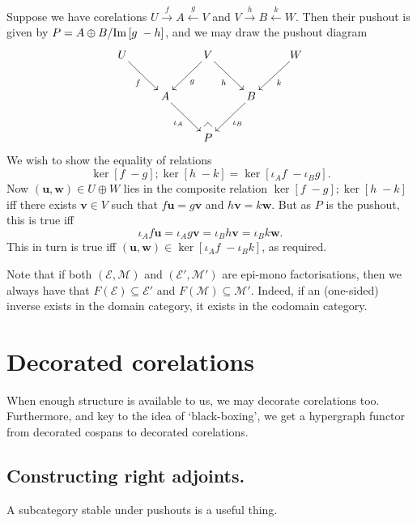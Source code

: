 \begin{example}
  Suppose we have corelations $U \xrightarrow{f} A \xleftarrow{g} V$
  and $V \xrightarrow{h} B \xleftarrow{k} W$. Then their pushout is given by
  $P=A \oplus B/\mathrm{Im}\,[g\;-h]$, and we may draw the pushout diagram
  \[
    \xymatrix{
      U \ar[dr]_{f} & & V \ar[dl]^{g}  
      \ar[dr]_{h} & & W \ar[dl]^{k} {} 
      \\
      & A \ar[dr]_{\iota_A} & & B \ar[dl]^{\iota_B}  \\
      & & P {\save*!<0cm,-.5cm>[dl]@^{|-}\restore}
    }
  \]
  We wish to show the equality of relations
  \[
    \ker[f\;-g];\ker[h\;-k] = \ker[\iota_A f\; -\iota_B g].
  \]
  Now $(\mathbf{u},\mathbf{w}) \in U \oplus W$ lies in the composite relation
  $\ker[f\;-g];\ker[h\;-k]$ iff there exists $\mathbf{v} \in V$ such that
  $f\mathbf{u} = g\mathbf{v}$ and $h\mathbf{v} = k\mathbf{w}$. But as $P$ is the
  pushout, this is true iff 
  \[
    \iota_A f \mathbf{u} = \iota_A g \mathbf{v} = \iota_B h \mathbf{v} =
    \iota_B k \mathbf{w}.
  \]
  This in turn is true iff $(\mathbf{u}, \mathbf{w}) \in \ker[\iota_Af\;
  -\iota_Bk]$, as required. 
\end{example}

Note that if both $(\mathcal E, \mathcal M)$ and $(\mathcal E', \mathcal M')$
are epi-mono factorisations, then we always have that $F(\mathcal E) \subseteq
\mathcal E'$ and $F(\mathcal M) \subseteq \mathcal M'$. Indeed, if an
(one-sided) inverse exists in the domain category, it exists in the codomain
category.



\section{Decorated corelations} \label{sec:dcorc}

When enough structure is available to us, we may decorate corelations too.
Furthermore, and key to the idea of `black-boxing', we get a hypergraph functor
from decorated cospans to decorated corelations.


\subsection{Constructing right adjoints.}
A subcategory stable under pushouts is a useful thing.


